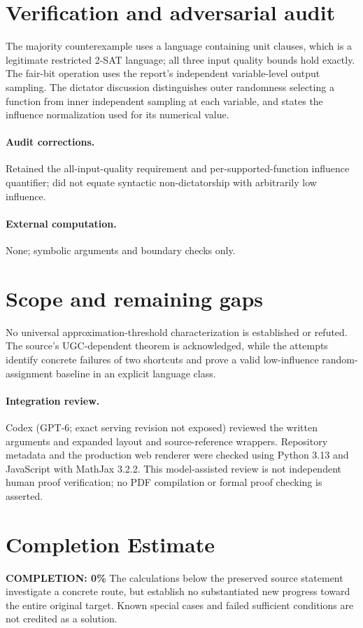 \documentclass[11pt]{article}
\begin{document}
\section{Verification and adversarial audit}
The majority counterexample uses a language containing unit clauses, which is a legitimate restricted 2-SAT language; all three input quality bounds hold exactly. The fair-bit operation uses the report's independent variable-level output sampling. The dictator discussion distinguishes outer randomness selecting a function from inner independent sampling at each variable, and states the influence normalization used for its numerical value.
\paragraph{Audit corrections.} Retained the all-input-quality requirement and per-supported-function influence quantifier; did not equate syntactic non-dictatorship with arbitrarily low influence.
\paragraph{External computation.} None; symbolic arguments and boundary checks only.
\section{Scope and remaining gaps}
No universal approximation-threshold characterization is established or refuted. The source's UGC-dependent theorem is acknowledged, while the attempts identify concrete failures of two shortcuts and prove a valid low-influence random-assignment baseline in an explicit language class.
\paragraph{Integration review.} Codex (GPT-6; exact serving revision not exposed) reviewed the written arguments and expanded layout and source-reference wrappers. Repository metadata and the production web renderer were checked using Python 3.13 and JavaScript with MathJax 3.2.2. This model-assisted review is not independent human proof verification; no PDF compilation or formal proof checking is asserted.

\section{Completion Estimate}
\noindent\textbf{COMPLETION: 0\%}
The calculations below the preserved source statement investigate a concrete route,
but establish no substantiated new progress toward the entire original target.
Known special cases and failed sufficient conditions are not credited as a solution.
\end{document}
